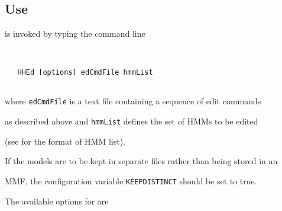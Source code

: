 \subsection{Use}





 is invoked by typing the command line


\begin{verbatim}


   HHEd [options] edCmdFile hmmList


\end{verbatim}


where \texttt{edCmdFile} is a text file containing a sequence of edit commands


as described above and \texttt{hmmList} defines the set of HMMs to be edited


(see  for the format of HMM list). 


If the models are to be kept in separate files rather than being stored in an


MMF, the configuration variable \texttt{KEEPDISTINCT} should be set to true.


The available options for  are





